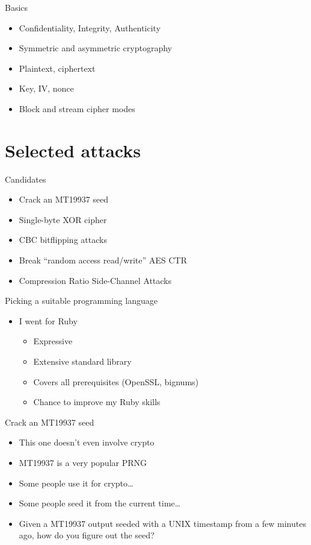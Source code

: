\documentclass[presentation]{beamer}
\begin{document}
\begin{frame}[label={sec:org8b26012}]{Basics}
\begin{itemize}
\item Confidentiality, Integrity, Authenticity
\item Symmetric and asymmetric cryptography
\item Plaintext, ciphertext
\item Key, IV, nonce
\item Block and stream cipher modes
\end{itemize}
\end{frame}

\section{Selected attacks}
\label{sec:org3070d11}

\begin{frame}[label={sec:orgcf0276e}]{Candidates}
\begin{itemize}
\item Crack an MT19937 seed
\item Single-byte XOR cipher
\item CBC bitflipping attacks
\item Break “random access read/write” AES CTR
\item Compression Ratio Side-Channel Attacks
\end{itemize}
\end{frame}

\begin{frame}[label={sec:org31edd22}]{Picking a suitable programming language}
\begin{itemize}
\item I went for Ruby
\begin{itemize}
\item Expressive
\item Extensive standard library
\item Covers all prerequisites (OpenSSL, bignums)
\item Chance to improve my Ruby skills
\end{itemize}
\end{itemize}
\end{frame}

\begin{frame}[label={sec:org30dcf5b}]{Crack an MT19937 seed}
\begin{itemize}
\item This one doesn't even involve crypto
\item MT19937 is a very popular PRNG
\item Some people use it for crypto\ldots{}
\item Some people seed it from the current time\ldots{}
\item Given a MT19937 output seeded with a UNIX timestamp from a few
minutes ago, how do you figure out the seed?
\end{itemize}
\end{frame}
\end{document}
